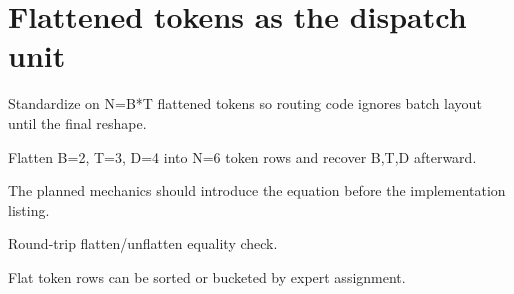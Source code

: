 \section{Flattened tokens as the dispatch unit}
\label{sec:ch06-flattened-tokens-as-the-dispatch-unit}

Standardize on N=B*T flattened tokens so routing code ignores batch layout until the final reshape.



Flatten B=2, T=3, D=4 into N=6 token rows and recover B,T,D afterward.



The planned mechanics should introduce the equation before the implementation listing.





\begin{checkpointbox}
Round-trip flatten/unflatten equality check.
\end{checkpointbox}

Flat token rows can be sorted or bucketed by expert assignment.
